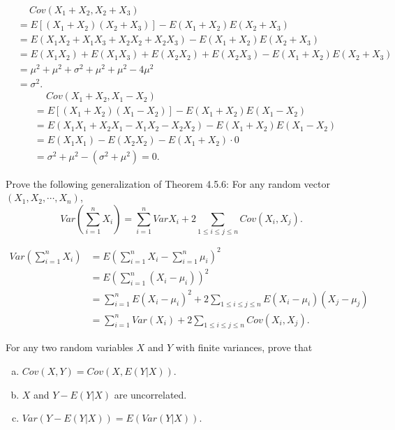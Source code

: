 \documentclass[14pt]{elegantbook}
\begin{document}
    \begin{solution}
        \begin{align*}
            &\quad\ Cov(X_1 + X_2, X_2 + X_3)\\&=E[(X_1 + X_2)(X_2 + X_3)]-E(X_1 + X_2)E(X_2 + X_3)\\
            &=E(X_1X_2 + X_1X_3 + X_2X_2 + X_2X_3)-E(X_1 + X_2)E(X_2 + X_3)\\
            &=E(X_1X_2) + E(X_1X_3) + E(X_2X_2) + E(X_2X_3) - E(X_1 + X_2)E(X_2 + X_3)\\
            &=\mu^2+\mu^2+\sigma^2+\mu^2+\mu^2-4\mu^2\\
            &=\sigma^2.
        \end{align*}
        \begin{align*}
            &\quad\ Cov(X_1 + X_2, X_1 - X_2)\\
            &=E[(X_1 + X_2)(X_1 - X_2)]-E(X_1 + X_2)E(X_1 - X_2)\\
            &=E(X_1X_1 + X_2X_1 - X_1X_2 - X_2X_2) - E(X_1 + X_2)E(X_1 - X_2)\\
            &=E(X_1X_1) - E(X_2X_2) - E(X_1 + X_2)\cdot 0\\
            &=\sigma^2+\mu^2-(\sigma^2+\mu^2)=0. 
        \end{align*}
    \end{solution}


    \setcounter{exer}{43}
    \begin{exercise}
        Prove the following generalization of Theorem 4.5.6: For any random vector $(X_1, X_2, \cdots, X_n)$, 
        \[Var\left(\sum_{i=1}^nX_i\right)=\sum_{i=1}^nVar X_i+2\sum_{1\leq i\leq j\leq n}Cov(X_i, X_j). \]
    \end{exercise}

    \begin{solution}
        \begin{align*}
            Var\left(\sum_{i=1}^n X_i\right)&=E\left(\sum_{i=1}^n X_i-\sum_{i=1}^n\mu_i\right)^2\\
            &=E\left(\sum_{i=1}^n (X_i-\mu_i)\right)^2\\
            &=\sum_{i=1}^nE(X_i-\mu_i)^2+2\sum_{1\leq i\leq j\leq n}E(X_i-\mu_i)(X_j-\mu_j)\\
            &=\sum_{i=1}^nVar(X_i)+2\sum_{1\leq i\leq j\leq n}Cov(X_i, X_j).
        \end{align*}
    \end{solution}

    \setcounter{exer}{57}
    \begin{exercise}
        For any two random variables $X$ and $Y$ with finite variances, prove that 
        \begin{enumerate}[(a)]
            \item \(Cov(X, Y)=Cov(X, E(Y|X))\). 
            \item $X$ and $Y-E(Y|X)$ are uncorrelated. 
            \item $Var(Y-E(Y|X)) = E(Var(Y|X))$. 
        \end{enumerate}
    \end{exercise}
\end{document}
